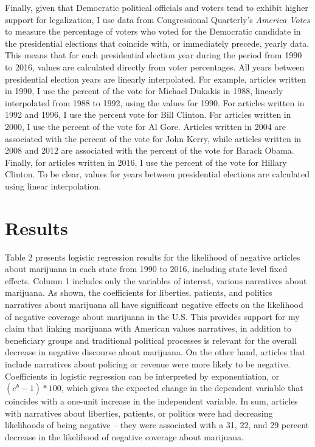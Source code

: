 Finally, given that Democratic political officials and voters tend to exhibit higher support for legalization, I use data from Congressional Quarterly's {\it{America Votes}} to measure the percentage of voters who voted for the Democratic candidate in the presidential elections that coincide with, or immediately precede, yearly data. This means that for each presidential election year during the period from 1990 to 2016, values are calculated directly from voter percentages. All years between presidential election years are linearly interpolated. For example, articles written in 1990, I use the percent of the vote for Michael Dukakis in 1988, linearly interpolated from 1988 to 1992, using the values for 1990. For articles written in 1992 and 1996, I use the percent vote for Bill Clinton. For articles written in 2000, I use the percent of the vote for Al Gore. Articles written in 2004 are associated with the percent of the vote for John Kerry, while articles written in 2008 and 2012 are associated with the percent of the vote for Barack Obama. Finally, for articles written in 2016, I use the percent of the vote for Hillary Clinton. To be clear, values for years between presidential elections are calculated using linear interpolation. 



\section{Results}

Table 2 presents logistic regression results for the likelihood of negative articles about marijuana in each state from 1990 to 2016, including state level fixed effects. Column 1 includes only the variables of interest, various narratives about marijuana. As shown, the coefficients for liberties, patients, and politics narratives about marijuana all have significant negative effects on the likelihood of negative coverage about marijuana in the U.S. This provides support for my claim that linking marijuana with American values narratives, in addition to beneficiary groups and traditional political processes is relevant for the overall decrease in negative discourse about marijuana. On the other hand, articles that include narratives about policing or revenue were more likely to be negative. Coefficients in logistic regression can be  interpreted by exponentiation, or $(e^{b} - 1)*100$, which gives the expected change in the dependent variable that coincides with a one-unit increase in the independent variable. In sum, articles with narratives about liberties, patients, or politics were had decreasing likelihoods of being negative -- they were associated with a 31, 22, and 29 percent decrease in the likelihood of negative coverage about marijuana.

